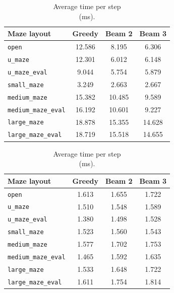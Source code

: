 ﻿\documentclass[12pt,a4paper]{article}
\theoremstyle{definition}
\begin{document}
\begin{table}[H]
\centering
\begin{minipage}[t]{0.49\textwidth}
	\centering
	\caption{Average compute time per query (ms).}
	\label{tab:compute_time_all8}
	\scriptsize
	\setlength{\tabcolsep}{3pt}
	\begin{tabular}{lccc}
		\hline
		Maze layout & Greedy & Beam 2 & Beam 3 \\
		\hline
		\texttt{open} & 12.586 & 8.195 & 6.306 \\
		\texttt{u\_maze} & 12.301 & 6.012 & 6.148 \\
		\texttt{u\_maze\_eval} & 9.044 & 5.754 & 5.879 \\
		\texttt{small\_maze} & 3.249 & 2.663 & 2.667 \\
		\texttt{medium\_maze} & 15.382 & 10.485 & 9.589 \\
		\texttt{medium\_maze\_eval} & 16.192 & 10.601 & 9.227 \\
		\texttt{large\_maze} & 18.878 & 15.355 & 14.628 \\
		\texttt{large\_maze\_eval} & 18.719 & 15.518 & 14.655 \\
		\hline
	\end{tabular}
\end{minipage}
\hfill
\begin{minipage}[t]{0.49\textwidth}
	\centering
	\caption{Average time per step\protect\\(ms).}
	\label{tab:time_per_step_all8}
	\scriptsize
	\setlength{\tabcolsep}{3pt}
	\begin{tabular}{lccc}
		\hline
		Maze layout & Greedy & Beam 2 & Beam 3 \\
		\hline
		\texttt{open} & 1.613 & 1.655 & 1.722 \\
		\texttt{u\_maze} & 1.510 & 1.548 & 1.589 \\
		\texttt{u\_maze\_eval} & 1.380 & 1.498 & 1.528 \\
		\texttt{small\_maze} & 1.523 & 1.560 & 1.543 \\
		\texttt{medium\_maze} & 1.577 & 1.702 & 1.753 \\
		\texttt{medium\_maze\_eval} & 1.465 & 1.592 & 1.635 \\
		\texttt{large\_maze} & 1.533 & 1.648 & 1.722 \\
		\texttt{large\_maze\_eval} & 1.611 & 1.754 & 1.814 \\
		\hline
	\end{tabular}
\end{minipage}
\end{table}
\end{document}
